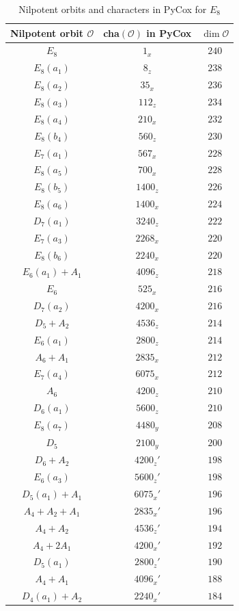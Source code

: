 \documentclass[reqno,12pt]{amsart}
\numberwithin{equation}{section}
\theoremstyle{plain}
\theoremstyle{definition}
\begin{document}
\begin{table}[htbp]\caption{Nilpotent orbits and characters in PyCox for $ E_8$ }
	\label{tabchare8-0}
	\centering
	\renewcommand{\arraystretch}{1.3}
	\setlength\tabcolsep{5pt}
{	\begin{tabular}{|c|c|c|}
		\hline   Nilpotent orbit $\mathcal{O}$ & cha$(\mathcal{O})$ in PyCox & $\dim \mathcal{O}$ \\ \hline
 $E_8$& $1_x$& $240$\\\hline
 $E_{8}(a_1)$& $8_z$& $238$\\\hline
 $E_{8}(a_2)$& $35_x$& $236$\\\hline
 $E_{8}(a_3)$& $112_z$& $234$\\\hline
 $E_{8}(a_4)$& $210_x$& $232$\\\hline
 $E_{8}(b_4)$& $560_z$& $230$\\\hline
 $E_{7}(a_1)$& $567_x$& $228$\\
 $E_{8}(a_5)$& $700_x$& $228$\\\hline
 $E_{8}(b_5)$& $1400_z$& $226$\\\hline
 $E_{8}(a_6)$& $1400_x$& $224$\\\hline
 $D_{7}(a_1)$& $3240_z$& $222$\\\hline
 $E_{7}(a_3)$& $2268_x$& $220$\\
 $E_{8}(b_6)$& $2240_x$& $220$\\\hline
 $E_{6}(a_1)+A_1$& $4096_z$& $218$\\\hline
 $E_{6}$& $525_x$& $216$\\
 $D_{7}(a_2)$& $4200_x$& $216$\\\hline
 $D_5+A_2$& $4536_z$& $214$\\
 $E_6(a_1)$& $2800_z$& $214$\\\hline
 $A_6+A_1$& $2835_x$& $212$\\
 $E_7(a_4)$& $6075_x$& $212$\\\hline
 $A_6$& $4200_z$& $210$\\
 $D_6(a_1)$& $5600_z$& $210$\\\hline
 $E_8(a_7)$& $4480_y$& $208$\\\hline
 $D_5$& $2100_y$& $200$\\\hline
 $D_6+A_2$& $4200_z'$& $198$\\
 $E_6(a_3)$& $5600_z'$& $198$\\\hline
 $D_5(a_1)+A_1$& $6075_x'$& $196$\\
 $A_4+A_2+A_1$& $2835_x'$& $196$\\\hline
 $A_4+A_2$& $4536_z'$& $194$\\\hline
 $A_4+2A_1$& $4200_x'$& $192$\\\hline
 $D_5(a_1)$& $2800_z'$& $190$\\\hline
 $A_4+A_1$& $4096_x'$& $188$\\\hline
 $D_4(a_1)+A_2$& $2240_x'$& $184$\\\hline
\end{tabular}}
	\bigskip
\end{table}
\end{document}
